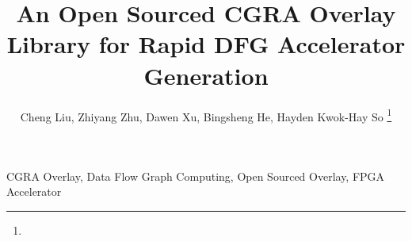 \documentclass[journal]{IEEEtran}
\begin{document}
\title{An Open Sourced CGRA Overlay Library for Rapid DFG Accelerator Generation}
\author{Cheng Liu, Zhiyang Zhu, Dawen Xu, Bingsheng He, Hayden Kwok-Hay So%
\thanks{}
}
\maketitle

\begin{abstract}
    
\end{abstract}

\begin{IEEEkeywords}
CGRA Overlay, Data Flow Graph Computing, Open Sourced Overlay, FPGA Accelerator
\end{IEEEkeywords}










\end{document}
